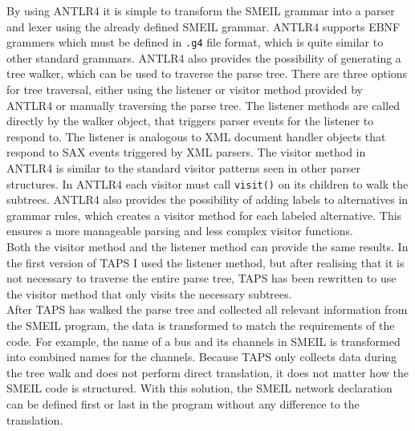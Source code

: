 By using ANTLR4 it is simple to transform the SMEIL grammar into a parser and lexer using the already defined SMEIL grammar. ANTLR4 supports EBNF grammers which must be defined in \texttt{.g4} file format, which is quite similar to other standard grammars. ANTLR4 also provides the possibility of generating a tree walker, which can be used to traverse the parse tree. There are three options for tree traversal, either using the listener or visitor method provided by ANTLR4 or manually traversing the parse tree.
The listener methods are called directly by the walker object, that triggers parser events for the listener to respond to. The listener is analogous to XML document handler objects that respond to SAX events triggered by XML parsers. The visitor method in ANTLR4 is similar to the standard visitor patterns seen in other parser structures. In ANTLR4 each visitor must call \texttt{visit()} on its children to walk the subtrees. ANTLR4 also provides the possibility of adding labels to alternatives in grammar rules, which creates a visitor method for each labeled alternative. This ensures a more manageable parsing and less complex visitor functions. \\

Both the visitor method and the listener method can provide the same results. In the first version of TAPS I used the listener method, but after realising that it is not necessary to traverse the entire parse tree, TAPS has been rewritten to use the visitor method that only visits the necessary subtrees.\\

After TAPS has walked the parse tree and collected all relevant information from the SMEIL program, the data is transformed to match the requirements of the \cspm{} code. For example, the name of a bus and its channels in SMEIL is transformed into combined names for the \cspm{} channels. Because TAPS only collects data during the tree walk and does not perform direct translation, it does not matter how the SMEIL code is structured. With this solution, the SMEIL network declaration can be defined first or last in the program without any difference to the translation.\\
